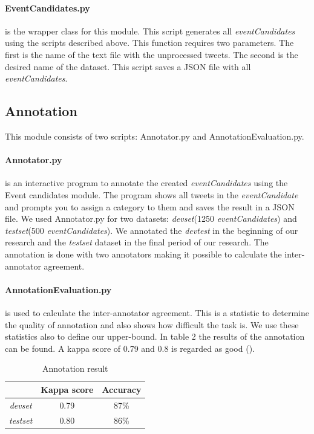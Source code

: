 \documentclass[
10pt, %
a4paper, %
oneside, %
headinclude,footinclude, %
BCOR5mm, %
]{scrartcl}
\begin{document}
\paragraph{EventCandidates.py} is the wrapper class for this module. This script generates all \textit{eventCandidates} using the scripts described above. This function requires two parameters. The first is the name of the text file with the unprocessed tweets. The second is the desired name of the dataset. This script saves a JSON file with all \textit{eventCandidates}.

\subsection{Annotation}
This module consists of two scripts: Annotator.py and AnnotationEvaluation.py.

\paragraph{Annotator.py}  is an interactive program to annotate the created \textit{eventCandidates} using the Event candidates module. The program shows all tweets in the \textit{eventCandidate} and prompts you to assign a category to them and saves the result in a JSON file. We used Annotator.py for two datasets: \textit{devset}(1250 \textit{eventCandidates}) and \textit{testset}(500 \textit{eventCandidates}). We annotated the \textit{devtest} in the beginning of our research and the \textit{testset} dataset in the final period of our research. The annotation is done with two annotators making it possible to calculate the inter-annotator agreement.

\paragraph{AnnotationEvaluation.py} is used to calculate the inter-annotator agreement. This is a statistic to determine the quality of annotation and also shows how difficult the task is. We use these statistics also to define our upper-bound. In table 2 the results of the annotation can be found. A kappa score of 0.79 and 0.8 is regarded as good (\citealt{manning2008introduction}).

\begin{table}[h]
 \centering
\caption[Annotation result]{Annotation result }
\begin{tabular}{|c|c|c|}
\hline
              & Kappa score & Accuracy \\ \hline
{\it devset}  & 0.79  & 87\%     \\ \hline
{\it testset} & 0.80  & 86\%     \\ \hline
\end{tabular}
\end{table}
\end{document}
